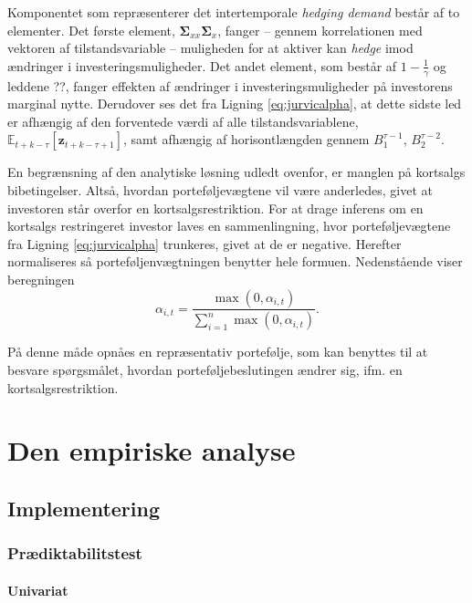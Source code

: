 \documentclass[
  a4paper,
  oneside]{memoir}
\begin{document}
Komponentet som repræsenterer det intertemporale \emph{hedging demand} består af to elementer. Det første element, \(\bm{\Sigma}_{xx}\bm{\Sigma}_x\), fanger -- gennem korrelationen med vektoren af tilstandsvariable -- muligheden for at aktiver kan \emph{hedge} imod ændringer i investeringsmuligheder. Det andet element, som består af \(1-\tfrac{1}{\gamma}\) og leddene ??, fanger effekten af ændringer i investeringsmuligheder på investorens marginal nytte. Derudover ses det fra Ligning \eqref{eq:jurvicalpha}, at dette sidste led er afhængig af den forventede værdi af alle tilstandsvariablene, \(\mathbb{E}_{t+k-\tau}[\bm{z}_{t+k-\tau+1}]\), samt afhængig af horisontlængden gennem \(B_1^{\tau-1}\), \(B_2^{\tau-2}\).

En begrænsning af den analytiske løsning udledt ovenfor, er manglen på kortsalgs bibetingelser. Altså, hvordan porteføljevægtene vil være anderledes, givet at investoren står overfor en kortsalgsrestriktion. For at drage inferens om en kortsalgs restringeret investor laves en sammenlingning, hvor porteføljevægtene fra Ligning \eqref{eq:jurvicalpha} trunkeres, givet at de er negative. Herefter normaliseres så porteføljenvægtningen benytter hele formuen. Nedenstående viser beregningen
\[\alpha_{i,t}=\frac{\max(0,\alpha_{i,t})}{\sum_{i=1}^n \max(0,\alpha_{i,t})}.\]

På denne måde opnåes en repræsentativ portefølje, som kan benyttes til at besvare spørgsmålet, hvordan porteføljebeslutingen ændrer sig, ifm. en kortsalgsrestriktion.

\part{Den empiriske analyse}

\hypertarget{implementering}{%
\chapter{Implementering}\label{implementering}}

\hypertarget{pruxe6diktabilitstest}{%
\section{Prædiktabilitstest}\label{pruxe6diktabilitstest}}

\hypertarget{univariat}{%
\subsection{Univariat}\label{univariat}}
\end{document}

